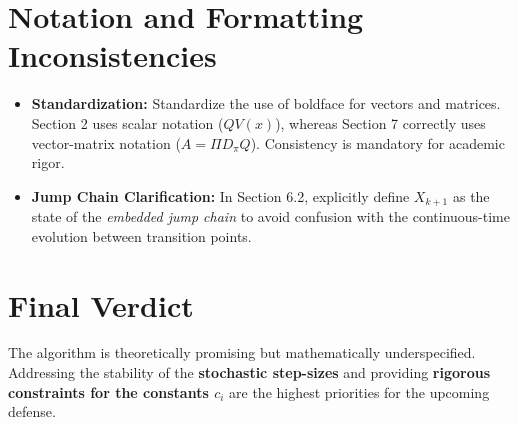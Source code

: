 \documentclass[11pt]{article}
\begin{document}
\section{Notation and Formatting Inconsistencies}
\begin{itemize}
    \item \textbf{Standardization:} Standardize the use of boldface for vectors and matrices. Section 2 uses scalar notation ($QV(x)$), whereas Section 7 correctly uses vector-matrix notation ($A = \Pi D_\pi Q$). Consistency is mandatory for academic rigor.
    \item \textbf{Jump Chain Clarification:} In Section 6.2, explicitly define $X_{k+1}$ as the state of the \textit{embedded jump chain} to avoid confusion with the continuous-time evolution between transition points.
\end{itemize}

\section*{Final Verdict}
The algorithm is theoretically promising but mathematically underspecified. Addressing the stability of the \textbf{stochastic step-sizes} and providing \textbf{rigorous constraints for the constants $c_i$} are the highest priorities for the upcoming defense.
\end{document}
